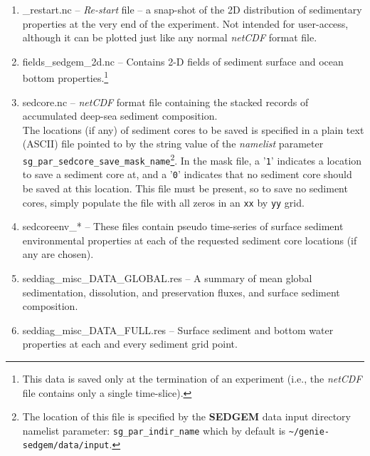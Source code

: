 \documentclass[11pt,fleqn]{book} %
\begin{document}
\begin{enumerate}

\vspace{1mm}\item \textsf{\footnotesize *\_restart.nc} -- \textit{Re-start} file -- a snap-shot of the 2D distribution of sedimentary properties at the very end of the experiment. Not intended for user-access, although it can be plotted just like any normal \textit{netCDF} format file.

\vspace{1mm}\item \textsf{\footnotesize fields\_sedgem\_2d.nc} -- Contains 2-D fields of sediment surface and ocean bottom properties.\footnote{This data is saved only at the termination of an experiment (i.e., the \textit{netCDF} file contains only a single time-slice).}

\vspace{1mm}\item \textsf{\footnotesize sedcore.nc} -- \textit{netCDF} format file containing the stacked records of accumulated deep-sea sediment composition.
\\The locations (if any) of sediment cores to be saved is specified in a plain text (ASCII) file pointed to by the string value of the \textit{namelist} parameter \texttt{sg\_par\_sedcore\_save\_mask\_name}\footnote{The location of this file is specified by the \textbf{SEDGEM} data input directory namelist parameter: \texttt{sg\_par\_indir\_name} which by default is \texttt{\~{}/genie-sedgem/data/input}.}. In the mask file, a '\texttt{1}' indicates a location to save a sediment core at, and a '\texttt{0}' indicates that no sediment core should be saved at this location.       This file must be present, so to save no sediment cores, simply populate the file with all zeros in an \texttt{xx} by \texttt{yy} grid.

\vspace{1mm}\item \textsf{\footnotesize sedcoreenv\_*} -- These files contain pseudo time-series of surface sediment environmental properties at each of the requested sediment core locations (if any are chosen).

\vspace{1mm}\item \textsf{\footnotesize seddiag\_misc\_DATA\_GLOBAL.res} -- A summary of mean global sedimentation, dissolution, and preservation fluxes, and surface sediment composition.

\vspace{1mm}\item \textsf{\footnotesize seddiag\_misc\_DATA\_FULL.res} -- Surface sediment and bottom water properties at each and every sediment grid point.

\end{enumerate}\vspace{2mm}
\end{document}
